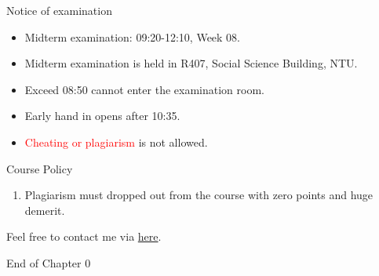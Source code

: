 \documentclass{beamer}
\begin{document}
\begin{frame}{Notice of examination}
\begin{itemize}
\item Midterm examination: 09:20-12:10, Week 08.
\item Midterm examination is held in R407, Social Science Building, NTU.
\item Exceed 08:50 cannot enter the examination room.
\item Early hand in opens after 10:35.
\item \textcolor{red}{Cheating or plagiarism} is not allowed.
\end{itemize}
\end{frame}
\begin{frame}{Course Policy}
\begin{enumerate}
\item Plagiarism must dropped out from the course with zero points and huge demerit. \\
\end{enumerate}
\end{frame}
\begin{frame}{}
\begin{center}
\Large{Feel free to contact me via \href{mailto:politics.tchsiao@gmail.com}{here}.}
\end{center}
\end{frame}
\begin{frame}{}
\begin{center}
\Large{End of Chapter 0}
\end{center}
\end{frame}
\end{document}
